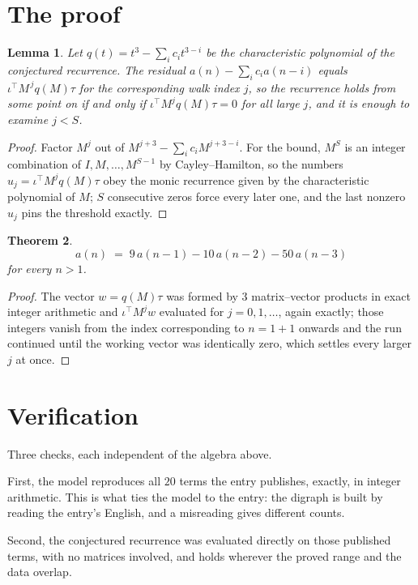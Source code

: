 \documentclass[11pt,a4paper]{article}
\theoremstyle{plain}
\newtheorem{theorem}{Theorem}
\newtheorem{lemma}[theorem]{Lemma}
\theoremstyle{definition}
\begin{document}
\section{The proof}

\begin{lemma}\label{lem:crit}
Let $q(t)=t^{3}-\sum_i c_it^{3-i}$ be the characteristic polynomial of the
conjectured recurrence. The residual $a(n)-\sum_ic_ia(n-i)$ equals
$\iota^{\!\top}M^{\,j}q(M)\tau$ for the corresponding walk index $j$, so the recurrence
holds from some point on if and only if $\iota^{\!\top}M^{j}q(M)\tau=0$ for all large $j$,
and it is enough to examine $j<S$.
\end{lemma}

\begin{proof}
Factor $M^{j}$ out of $M^{j+3}-\sum_ic_iM^{j+3-i}$. For the bound, $M^{S}$
is an integer combination of $I,M,\dots,M^{S-1}$ by Cayley--Hamilton, so the numbers
$u_j=\iota^{\!\top}M^{j}q(M)\tau$ obey the monic recurrence given by the characteristic
polynomial of $M$; $S$ consecutive zeros force every later one, and the last nonzero $u_j$
pins the threshold exactly.
\end{proof}

\begin{theorem}
\[
a(n)\;=\;9\,a(n-1) - 10\,a(n-2) - 50\,a(n-3)
\]
for every $n>1$.
\end{theorem}

\begin{proof}
The vector $w=q(M)\tau$ was formed by $3$ matrix--vector products in exact integer
arithmetic and $\iota^{\!\top}M^{j}w$ evaluated for $j=0,1,\dots$, again exactly; those
integers vanish from the index corresponding to $n=1+1$ onwards and the run continued
until the working vector was identically zero, which settles every larger $j$ at once.
\end{proof}

\section{Verification}

Three checks, each independent of the algebra above.

First, the model reproduces all $20$ terms the entry publishes, exactly, in integer
arithmetic. This is what ties the model to the entry: the digraph is built by reading the
entry's English, and a misreading gives different counts.

Second, the conjectured recurrence was evaluated directly on those published terms, with no
matrices involved, and holds wherever the proved range and the data overlap.
\end{document}
